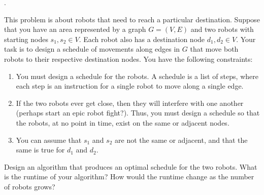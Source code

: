 \documentclass[12pt]{article}
\newcounter{quesnum}
\newcommand{\question}[2][??]{
\begin{list}{\labelitemi}{\leftmargin=2em}
\item [\arabic{quesnum}.] {#2}
\end{list}
\addtocounter{quesnum}{1}
}
\begin{document}
\question[3]{
This problem is about robots that need to reach a particular destination. Suppose that you have an area represented by a graph $G = (V,E)$ and two robots with starting nodes $s_1, s_2 \in V$. Each robot also has a destination node $d_1,d_2 \in V$. Your task is to design a schedule of movements along edges in $G$ that move both robots to their respective destination nodes. You have the following constraints:

\begin{enumerate}
\item You must design a schedule for the robots. A schedule is a list of steps, where each step is an instruction for a single robot to move along a single edge.
\item If the two robots ever get close, then they will interfere with one another (perhaps start an epic robot fight?). Thus, you must design a schedule so that the robots, at no point in time, exist on the same or adjacent nodes.
\item You can assume that $s_1$ and $s_2$ are not the same or adjacent, and that the same is true for $d_1$ and $d_2$.
\end{enumerate}

Design an algorithm that produces an optimal schedule for the two robots. What is the runtime of your algorithm? How would the runtime change as the number of robots grows?
}
\end{document}
